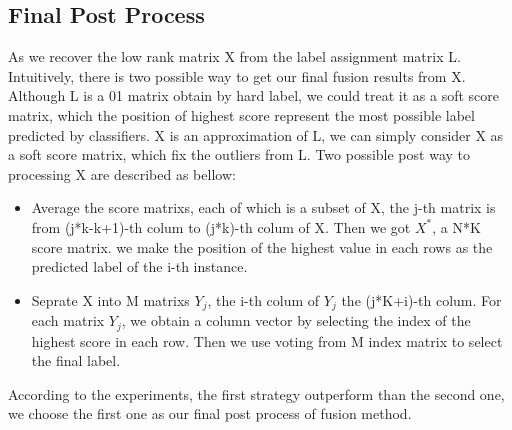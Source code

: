 \documentclass[letterpaper]{article}
\def\bL{{\bf L}}
\def\yanred{\textcolor{red}}
\begin{document}
\subsection{Final Post Process}
As we recover the low rank matrix X from the label assignment matrix L. Intuitively, there is two possible way to get our final fusion results from X. Although L is a 01 matrix obtain by hard label, we could treat it as a soft score matrix, which the position of highest score represent the most possible label predicted by classifiers. X is an approximation of L, we can simply consider X as a soft score matrix, which fix the outliers from L. Two possible post way to processing X are described as bellow:
\begin{itemize}
  \item Average the score matrixs, each of which is a subset of X, the j-th matrix is from (j*k-k+1)-th colum to (j*k)-th colum of X. Then we got $X^*$, a N*K score matrix. we make the position of the highest value in each rows as the predicted label of the i-th instance.
  \item Seprate X into M matrixs $Y_j$, the i-th colum of $Y_j$ the (j*K+i)-th colum. For each matrix $Y_j$, we obtain a column vector by selecting the index of the highest score in each row. Then we use voting from M index matrix to select the final label.
\end{itemize}
According to the experiments, the first strategy outperform than the second one, we choose the first one as our final post process of fusion method.

\end{document}
